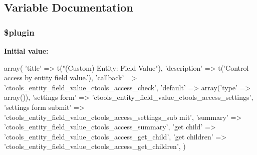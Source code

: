 \subsection{Variable Documentation}
\hypertarget{entity__field__value_8inc_ada8a7130088351710bb02ed622d6bf65}{
\subsubsection[{\$plugin}]{\setlength{\rightskip}{0pt plus 5cm}\$plugin}}
\label{entity__field__value_8inc_ada8a7130088351710bb02ed622d6bf65}
{\bfseries Initial value:}
\begin{DoxyCode}
 array(
  'title' => t("(Custom) Entity: Field Value"),
  'description' => t('Control access by entity field value.'),
  'callback' => 'ctools_entity_field_value_ctools_access_check',
  'default' => array('type' => array()),
  'settings form' => 'ctools_entity_field_value_ctools_access_settings',
  'settings form submit' => 'ctools_entity_field_value_ctools_access_settings_sub
      mit',
  'summary' => 'ctools_entity_field_value_ctools_access_summary',
  'get child' => 'ctools_entity_field_value_ctools_access_get_child',
  'get children' => 'ctools_entity_field_value_ctools_access_get_children',
)
\end{DoxyCode}
